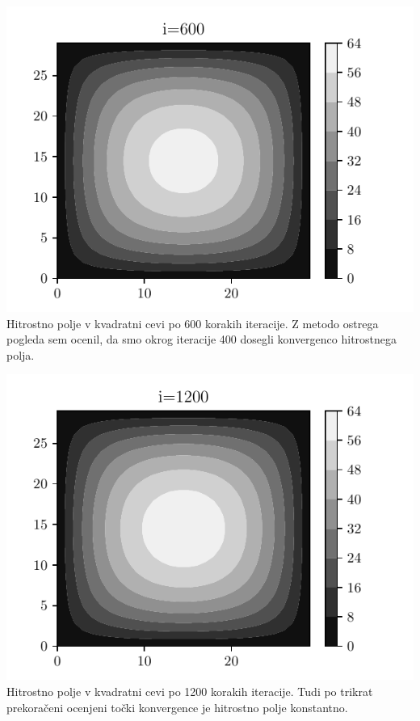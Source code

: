 \begin{center}
    \begin{minipage}{0.45\textwidth}
        \centering
    \includegraphics[width=\textwidth]{../old/0-kvadratna_i600.pdf}
    {Hitrostno polje v kvadratni cevi po 600 korakih iteracije. Z metodo ostrega pogleda sem ocenil, da smo okrog iteracije 400 dosegli konvergenco hitrostnega polja.}
    \end{minipage}\hfill
    \begin{minipage}{0.45\textwidth}
        \centering
        \includegraphics[width=1\textwidth]{../old/0-kvadratna_i1200.pdf}
    {Hitrostno polje v kvadratni cevi po 1200 korakih iteracije. Tudi po trikrat prekoračeni ocenjeni točki konvergence je hitrostno polje konstantno.}
    \end{minipage}
\end{center}
